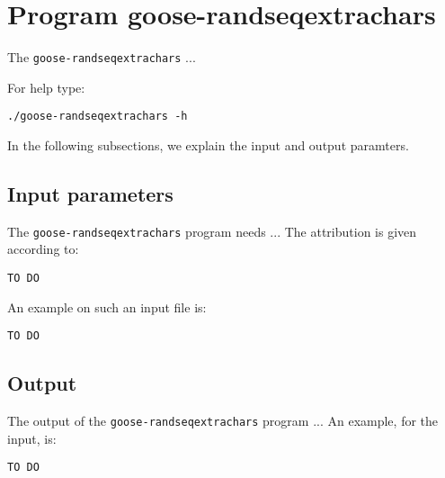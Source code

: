 \section{Program goose-randseqextrachars}
The \texttt{goose-randseqextrachars} ...

For help type:
\begin{lstlisting}
./goose-randseqextrachars -h
\end{lstlisting}
In the following subsections, we explain the input and output paramters.

\subsection*{Input parameters}

The \texttt{goose-randseqextrachars} program needs ...
The attribution is given according to:
\begin{lstlisting}
TO DO
\end{lstlisting}

An example on such an input file is:
\begin{lstlisting}
TO DO
\end{lstlisting}

\subsection*{Output}
The output of the \texttt{goose-randseqextrachars} program ...
An example, for the input, is:
\begin{lstlisting}
TO DO
\end{lstlisting}